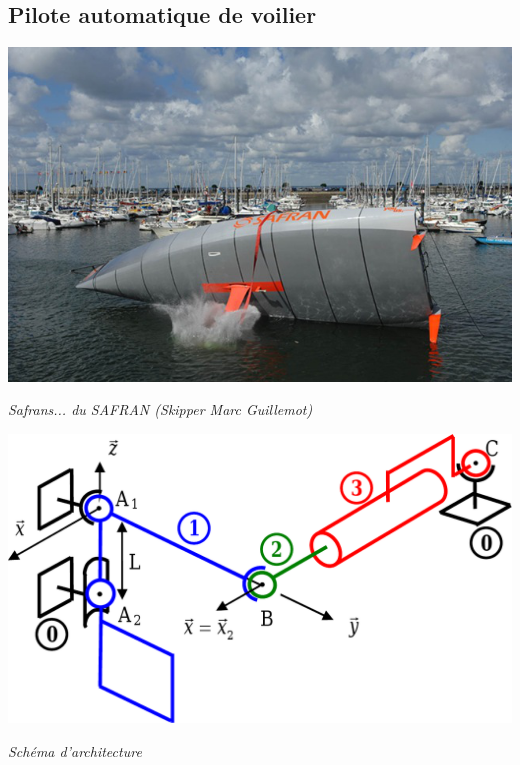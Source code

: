 \documentclass[10pt,fleqn]{article} %
\begin{document}

\vspace{6cm}
\pagestyle{fancy}
\thispagestyle{plain}


\def\columnseprulecolor{\color{ocre}}
\setlength{\columnseprule}{0.4pt} 

\ifprof
\else
\begin{multicols}{2}
\fi




\subsection*{Pilote automatique de voilier}
\setcounter{exo}{0}
\begin{center}
\includegraphics[width=.8\linewidth]{images/safran}

\textit{Safrans... du SAFRAN (Skipper Marc Guillemot)}
\end{center}

\begin{center}
\includegraphics[width=\linewidth]{images/safran2}

\textit{Schéma d'architecture}
\end{center}





\end{multicols}
\end{document}
